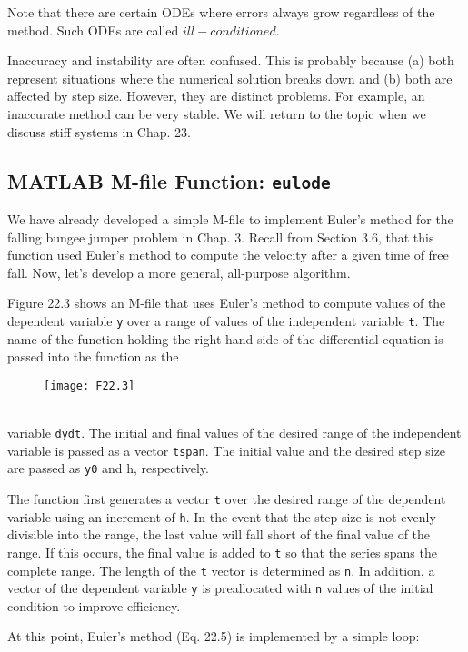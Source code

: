 \documentclass[../main.tex]{subfiles}
\begin{document}
Note that there are certain ODEs where errors always grow regardless of the method.
Such ODEs are called $ill-conditioned$.

Inaccuracy and instability are often confused. This is probably because (a) both represent situations where the numerical solution breaks down and (b) both are affected by step
size. However, they are distinct problems. For example, an inaccurate method can be very
stable. We will return to the topic when we discuss stiff systems in Chap. 23.

\subsection{MATLAB M-file Function: \texttt{eulode}}
We have already developed a simple M-file to implement Euler's method for the falling
bungee jumper problem in Chap. 3. Recall from Section 3.6, that this function used Euler's
method to compute the velocity after a given time of free fall. Now, let's develop a more
general, all-purpose algorithm.

Figure 22.3 shows an M-file that uses Euler's method to compute values of the dependent
variable \texttt{y} over a range of values of the independent variable \texttt{t}. The name of the function
holding the right-hand side of the differential equation is passed into the function as the\\
\begin{figure}[hbt!]
	\texttt{[image: F22.3]}
	\label{F22.3}
\end{figure}\\
variable \texttt{dydt}. The initial and final values of the desired range of the independent variable
is passed as a vector \texttt{tspan}. The initial value and the desired step size are passed as \texttt{y0} and
h, respectively.

The function first generates a vector \texttt{t} over the desired range of the dependent variable
using an increment of \texttt{h}. In the event that the step size is not evenly divisible into the range,
the last value will fall short of the final value of the range. If this occurs, the final value is
added to \texttt{t} so that the series spans the complete range. The length of the \texttt{t} vector is determined as \texttt{n}. In addition, a vector of the dependent variable \texttt{y} is preallocated with \texttt{n} values
of the initial condition to improve efficiency.

At this point, Euler's method (Eq. 22.5) is implemented by a simple loop:
\end{document}
